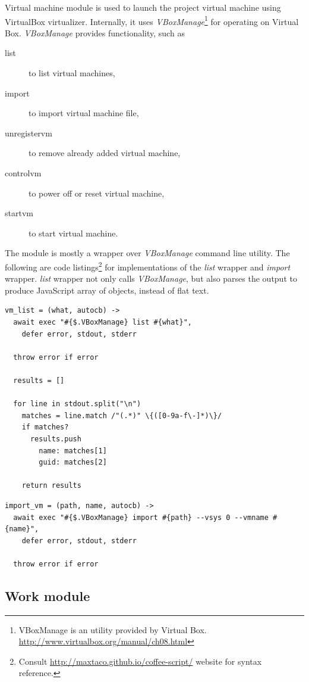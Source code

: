 Virtual machine module is used to launch the project virtual machine using VirtualBox virtualizer. Internally, it uses \emph{VBoxManage}\footnote{VBoxManage is an utility provided by Virtual Box. \url{http://www.virtualbox.org/manual/ch08.html}} for operating on Virtual Box. \emph{VBoxManage} provides functionality, such as

\begin{description}
\item[list] to list virtual machines,
\item[import] to import virtual machine file,
\item[unregistervm] to remove already added virtual machine,
\item[controlvm] to power off or reset virtual machine,
\item[startvm] to start virtual machine.
\end{description}

The module is mostly a wrapper over \emph{VBoxManage} command line utility. The following are code listings\footnote{Consult \url{http://maxtaco.github.io/coffee-script/} website for syntax reference.} for implementations of the \emph{list} wrapper and \emph{import} wrapper. \emph{list} wrapper not only calls \emph{VBoxManage}, but also parses the output to produce JavaScript array of objects, instead of flat text.

\begin{lstlisting}[caption=Function wrapping \emph{vm list} method.]
vm_list = (what, autocb) ->
  await exec "#{$.VBoxManage} list #{what}", 
    defer error, stdout, stderr

  throw error if error

  results = []

  for line in stdout.split("\n")
    matches = line.match /"(.*)" \{([0-9a-f\-]*)\}/
    if matches?
      results.push 
        name: matches[1]
        guid: matches[2]

    return results
\end{lstlisting}

\begin{lstlisting}[caption=Function wrapping \emph{vm import} method.]
import_vm = (path, name, autocb) ->
  await exec "#{$.VBoxManage} import #{path} --vsys 0 --vmname #{name}",
    defer error, stdout, stderr

  throw error if error
\end{lstlisting}

\subsection{Work module}


